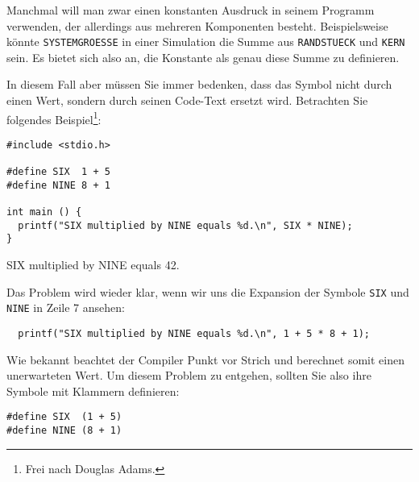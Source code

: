 \begin{warnbox}
Manchmal will man zwar einen konstanten Ausdruck in seinem Programm verwenden, der allerdings aus mehreren Komponenten besteht. Beispielsweise könnte \texttt{SYSTEMGROESSE} in einer Simulation die Summe aus \texttt{RANDSTUECK} und \texttt{KERN} sein. Es bietet sich also an, die Konstante als genau diese Summe zu definieren.

In diesem Fall aber müssen Sie immer bedenken, dass das Symbol nicht durch einen Wert, sondern durch seinen Code-Text ersetzt wird. Betrachten Sie folgendes Beispiel\footnote{Frei nach Douglas Adams.}:

\begin{codebox}
\begin{verbatim}
#include <stdio.h>

#define SIX  1 + 5
#define NINE 8 + 1

int main () {
  printf("SIX multiplied by NINE equals %d.\n", SIX * NINE);
}
\end{verbatim}
\end{codebox}

\begin{cmdbox}
SIX multiplied by NINE equals 42.
\end{cmdbox}

Das Problem wird wieder klar, wenn wir uns die Expansion der Symbole \texttt{SIX} und \texttt{NINE} in Zeile 7 ansehen:

\begin{codebox}
\begin{verbatim}
  printf("SIX multiplied by NINE equals %d.\n", 1 + 5 * 8 + 1);
\end{verbatim}
\end{codebox}

Wie bekannt beachtet der Compiler Punkt vor Strich und berechnet somit einen unerwarteten Wert. Um diesem Problem zu entgehen, sollten Sie also ihre Symbole mit Klammern definieren:

\begin{codebox}
\begin{verbatim}
#define SIX  (1 + 5)
#define NINE (8 + 1)
\end{verbatim}
\end{codebox}
\end{warnbox}

